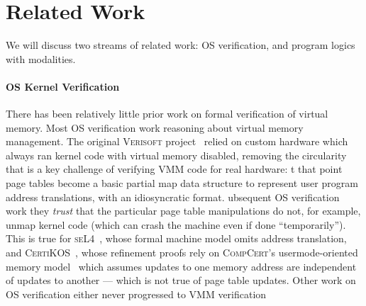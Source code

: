 \section{Related Work}
\label{sec:relwork}
We will discuss two streams of related work: OS verification, and 
program logics with modalities.

\paragraph{OS Kernel Verification}
There has been relatively little prior work on formal verification of virtual memory.
Most OS verification work  reasoning about virtual memory management.
The original \textsc{Verisoft} project~\cite{alkassar2008verisoft,alkassar2010pervasive,alkassar2008formal,dalinger2005verification,hillebrand2005address,alkassar2008formal,starostin2010formal} 
relied on custom hardware\del{,} which always ran kernel code with virtual memory disabled, removing the circularity that is a key challenge of verifying
VMM code for real hardware: t that point page tables become a basic partial map data structure to represent user program address translations,
with an idiosyncratic format. ubsequent OS verification work
 
 they \emph{trust}
that the particular page table manipulations do not, for example, unmap kernel code
 (which can crash the machine even if done ``temporarily'').
This is true for \textsc{seL4}~\cite{Klein2009seL4,seL4TOCS,Sewell2013translation}, whose formal machine model omits address translation,
and \textsc{CertiKOS}~\cite{gu15,gu2016certikos,gu2018certikos,chen2016interrupts}, whose refinement proofs rely on
\textsc{CompCert}'s usermode-oriented memory model~\cite{leroy2008formal,leroy2009formally} which assumes
updates to one memory address are independent of updates to another ---
which is not true of page table updates.
Other work on OS verification either never progressed  to  VMM verification
